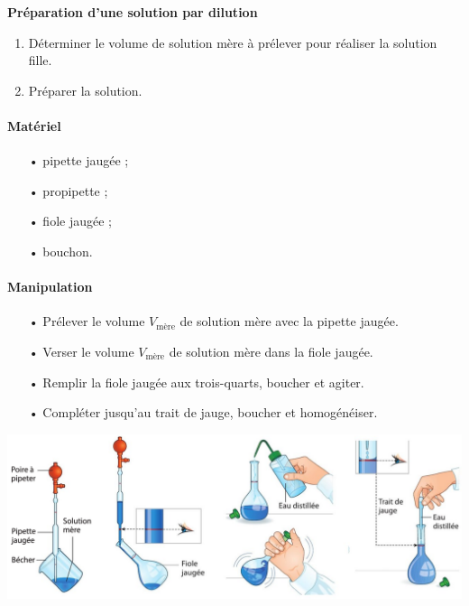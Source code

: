 \begin{bframe}
\textbf{Préparation d'une solution par dilution}
\begin{enumerate}
\item Déterminer le volume de solution mère à prélever pour réaliser la solution fille.

\item Préparer la solution.
\end{enumerate}

\begin{multicols}{2}
\paragraph*{Matériel}
\begin{itemize}
\item[•] pipette jaugée ;
\item[•] propipette ;
\item[•] fiole jaugée ;
\item[•] bouchon.
\end{itemize}

\newpage

\paragraph*{Manipulation}
\begin{itemize}
\item[•] Prélever le volume $V_\mathrm{mère}$ de solution mère avec la pipette jaugée.
\item[•] Verser le volume $V_\mathrm{mère}$ de solution mère dans la fiole jaugée.
\item[•] Remplir la fiole jaugée aux trois-quarts, boucher et agiter.
\item[•] Compléter jusqu'au trait de jauge, boucher et homogénéiser.
\end{itemize}
\end{multicols}

\begin{center}
\includegraphics[scale=0.4]{images/dilution.png}
\end{center}

\end{bframe}

